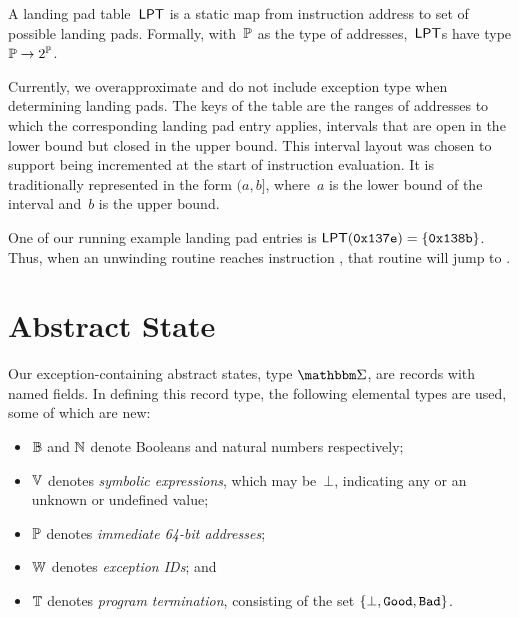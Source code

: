 \begin{definition}
  A landing pad table~$\operatorname{\mathsf{LPT}}$ is a static map from instruction address to set of possible landing pads.
  Formally, with~$\mathbb P$ as the type of addresses,~$\operatorname{\mathsf{LPT}}$s have type $\mathbb P\to2^\mathbb P$.
\end{definition}
Currently, we overapproximate and do not include exception type when determining landing pads.
The keys of the table are the ranges of addresses to which the corresponding landing pad entry applies, intervals that are open in the lower bound but closed in the upper bound. This interval layout was chosen to support  being incremented at the start of instruction evaluation. It is traditionally represented in the form $(a,b]$, where~$a$ is the lower bound of the interval and~$b$ is the upper bound.
\begin{example}\label{ex:landing-pad-table}
  One of our running example landing pad entries is  $\operatorname{\mathsf{LPT}}(\mathtt{0x137e})=\{\mathtt{0x138b}\}$.
  Thus, when an unwinding routine reaches instruction , %
  that routine will jump to .
\end{example}

\section{Abstract State}\label{sec:abstract-state}
Our exception-containing abstract states, type $\absState$, are records with named fields.
In defining this record type, the following elemental types are used, some of which are new:
\begin{itemize} %
  \item $\mathbb B$ and $\mathbb N$ denote Booleans and natural numbers respectively;
  \item $\mathbb V$ denotes \emph{symbolic expressions}, which may be~$\bot$, indicating any or an unknown or undefined value;
  \item $\mathbb P$ denotes \emph{immediate 64-bit addresses};
  \item $\mathbb W$ denotes \emph{exception IDs}; and
  \item $\mathbb T$ denotes \emph{program termination}, consisting of the set $\{\bot,\mathtt{Good},\mathtt{Bad}\}$.
\end{itemize}

